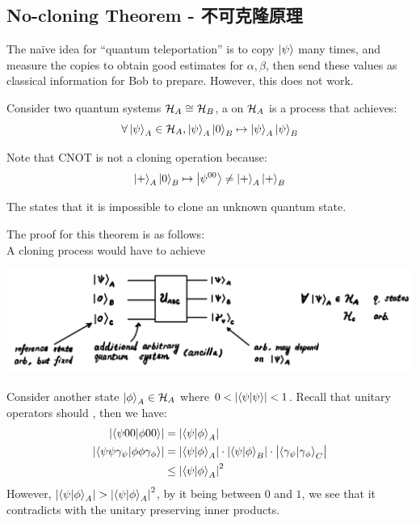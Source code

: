 \subsection{No-cloning Theorem - 不可克隆原理}
The na\"ive idea for ``quantum teleportation'' is to copy $\ket{\psi}$ many times, and measure the copies to obtain good estimates for $\alpha, \beta$, then send these values as classical information for Bob to prepare. However, this does not work. 
\begin{definition}
    Consider two quantum systems $\mathcal{H}_A \cong \mathcal{H}_B$, a  on $\mathcal{H}_A$ is a process that achieves:
    $$\forall \ket{\psi}_A \in \mathcal{H}_A, \ket{\psi}_A\ket{0}_B \mapsto \ket{\psi}_A\ket{\psi}_B$$
\end{definition}
Note that CNOT is not a cloning operation because:
$$\ket{+}_A \ket{0}_B \mapsto \ket{\psi^{00}} \ne \ket{+}_A\ket{+}_B$$
\begin{theorem}
    The  states that it is impossible to clone an unknown quantum state.
\end{theorem}
The proof for this theorem is as follows: \\
A cloning process would have to achieve
\begin{center}
    \includegraphics[scale = 0.75]{clone.png}
\end{center}
Consider another state $\ket{\phi}_A \in \mathcal{H}_A$ where $0 < \abs{\braket{\psi}{\psi}} < 1$. Recall that unitary operators should , then we have:
\begin{align*}
    \abs{\braket{\psi 0 0}{\phi 0 0}} &= \abs{\braket{\psi}{\phi}_A} \\
    \abs{\braket{\psi\psi\gamma_\psi}{\phi \phi \gamma_\phi}} &= \abs{\braket{\psi}{\phi}_A} \cdot \abs{\braket{\psi}{\phi}_B} \cdot \abs{\braket{\gamma_\psi}{\gamma_\phi}_C} \\
    &\le \abs{\braket{\psi}{\phi}_A}^2
\end{align*}
However, $\abs{\braket{\psi}{\phi}_A} > \abs{\braket{\psi}{\phi}_A}^2$, by it being between $0$ and $1$, we see that it contradicts with the unitary preserving inner products. \\
